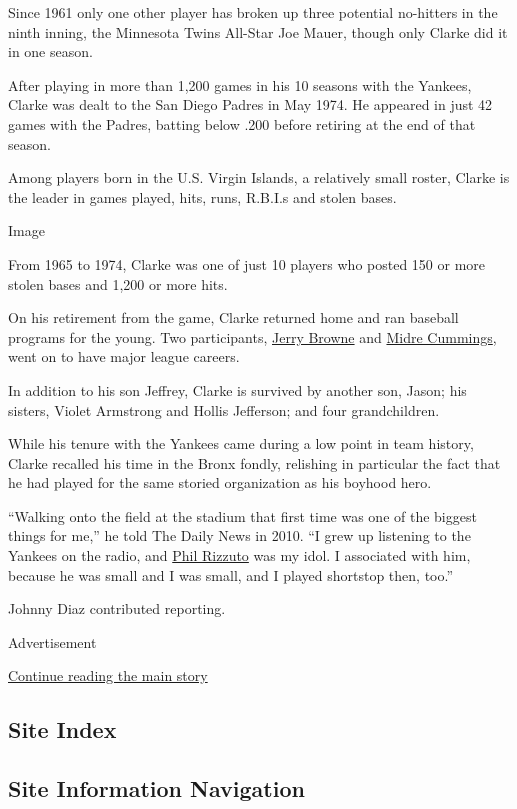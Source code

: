 Since 1961 only one other player has broken up three potential
no-hitters in the ninth inning, the Minnesota Twins All-Star Joe Mauer,
though only Clarke did it in one season.

After playing in more than 1,200 games in his 10 seasons with the
Yankees, Clarke was dealt to the San Diego Padres in May 1974. He
appeared in just 42 games with the Padres, batting below .200 before
retiring at the end of that season.

Among players born in the U.S. Virgin Islands, a relatively small
roster, Clarke is the leader in games played, hits, runs, R.B.I.s and
stolen bases.

Image

From 1965 to 1974, Clarke was one of just 10 players who posted 150 or
more stolen bases and 1,200 or more hits.

On his retirement from the game, Clarke returned home and ran baseball
programs for the young. Two participants,
\href{https://sabr.org/bioproj/person/jerry-browne/}{Jerry Browne} and
\href{https://sabr.org/bioproj/person/midre-cummings/}{Midre Cummings},
went on to have major league careers.

In addition to his son Jeffrey, Clarke is survived by another son,
Jason; his sisters, Violet Armstrong and Hollis Jefferson; and four
grandchildren.

While his tenure with the Yankees came during a low point in team
history, Clarke recalled his time in the Bronx fondly, relishing in
particular the fact that he had played for the same storied organization
as his boyhood hero.

``Walking onto the field at the stadium that first time was one of the
biggest things for me,'' he told The Daily News in 2010. ``I grew up
listening to the Yankees on the radio, and
\href{http://www.nydailynews.com/topics/Phil+Rizzuto}{Phil Rizzuto} was
my idol. I associated with him, because he was small and I was small,
and I played shortstop then, too.''

Johnny Diaz contributed reporting.

Advertisement

\protect\hyperlink{after-bottom}{Continue reading the main story}

\hypertarget{site-index}{%
\subsection{Site Index}\label{site-index}}

\hypertarget{site-information-navigation}{%
\subsection{Site Information
Navigation}\label{site-information-navigation}}

